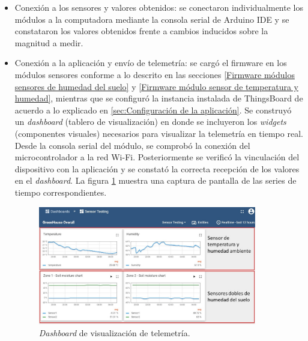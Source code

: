 \begin{itemize}
\item Conexión a los sensores y valores obtenidos: se conectaron individualmente los módulos a la computadora mediante la consola serial de Arduino IDE y se constataron los valores obtenidos frente a cambios inducidos sobre la magnitud a medir.


\item Conexión a la aplicación y envío de telemetría: se cargó el firmware en los módulos sensores conforme a lo descrito en las secciones \ref{Firmware módulos sensores de humedad del suelo} y \ref{Firmware módulo sensor de temperatura y humedad}, mientras que se configuró la instancia instalada de ThingsBoard de acuerdo a lo explicado en \ref{sec:Configuración de la aplicación}. Se construyó un \textit{dashboard} (tablero de visualización) en donde se incluyeron los \textit{widgets} (componentes visuales) necesarios para visualizar la telemetría en tiempo real.
Desde la consola serial del módulo, se comprobó la  conexión del microcontrolador a la red Wi-Fi. Posteriormente se verificó la vinculación del dispositivo con la aplicación y se constató la correcta recepción de los valores en el \textit{dashboard}. La figura \ref{fig:dashboard} muestra una captura de pantalla de las series de tiempo correspondientes.

\begin{figure}[!h]
	\centering
	\includegraphics[width=0.90\textwidth]{./Figures/chapter4/dashboard.jpg}
	\caption[\textit{Dashboard} de visualización de telemetría]{\textit{Dashboard} de visualización de telemetría.}
	\label{fig:dashboard}
\end{figure}





\end{itemize}

